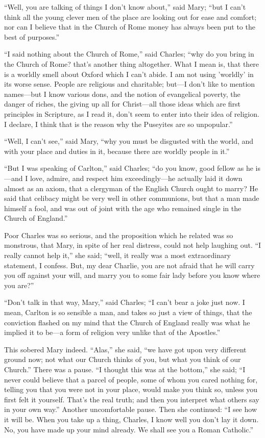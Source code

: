 ``Well, you are talking of things I don't know about,'' said Mary; ``but I can't think all the young clever
men of the place are looking out for ease and comfort; nor can I
believe that in the Church of Rome money has always been put to the
best of purposes.''

``I said nothing about the Church of Rome,'' said Charles;
``why do you bring in the Church of Rome? that's another thing
altogether. What I mean is, that there is a worldly smell about Oxford
which I can't abide. I am not using 'worldly' in its worse sense.
People are religious and charitable; but—I don't like to mention
names—but I know various dons, and the notion of evangelical
poverty, the danger of riches, the giving up all for Christ—all
those ideas which are first principles in Scripture, as I read it, don't
seem to enter into their idea of religion. I declare, I think that is
the reason why the Puseyites are so unpopular.''

``Well, I can't see,'' said Mary, ``why you must be
disgusted with the world, and with your place and duties in it,
because there are worldly people in it.''

``But I was speaking of Carlton,'' said Charles; ``do
you know, good fellow as he is—and I love, admire, and respect him
exceedingly—he actually laid it down almost as an axiom, that a
clergyman of the English Church ought to marry? He said that celibacy
might be very well in other communions, but that a man made himself a
fool, and was out of joint with the age who remained single in the
Church of England.''

Poor Charles was so serious, and the proposition which he related
was so monstrous, that Mary, in spite of her real distress, could not
help laughing out. ``I really cannot help it,'' she said;
``well, it really was a most extraordinary statement, I
confess. But, my dear Charlie, you are not afraid that he will carry
you off against your will, and marry you to some fair lady before you
know where you are?''

``Don't talk in that way, Mary,'' said Charles; ``I can't
bear a joke just now. I mean, Carlton is so sensible a man, and takes
so just a view of things, that the conviction flashed on my mind that
the Church of England really was what he implied it to be—a form of
religion very unlike that of the Apostles.''

This sobered Mary indeed. ``Alas,'' she said, ``we have
got upon very different ground now; not what our Church thinks of you,
but what you think of our Church.'' There was a pause. ``I
thought this was at the bottom,'' she said; ``I never could
believe that a parcel of people, some of whom you cared nothing for,
telling you that you were not in your place, would make you think so,
unless you first felt it yourself. That's the real truth; and then you
interpret what others say in your own way.'' Another uncomfortable
pause. Then she continued: ``I see how it will be. When you take
up a thing, Charles, I know well you don't lay it down. No, you have
made up your mind already. We shall see you a Roman Catholic.''

